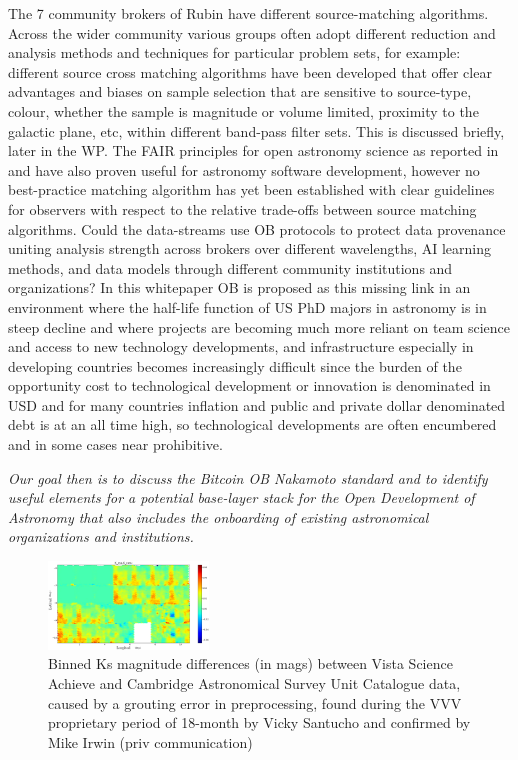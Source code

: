 \documentclass[final,5p,times,twocolumn,authoryear]{elsarticle}
\begin{document}
The 7 community brokers of Rubin have different source-matching \citep{bellm19} algorithms. Across the wider community various groups often adopt different reduction and analysis methods and techniques for particular problem sets, for example: different source cross matching algorithms have been developed that offer clear advantages and biases on sample selection that are sensitive to source-type, colour, whether the sample is magnitude or volume limited, proximity to the galactic plane, etc,  within different band-pass filter sets. This is discussed briefly, later in the WP. The FAIR principles for open astronomy science as reported in \cite{2022arXiv220310710O} and \cite{molinaro21} have also proven useful for astronomy software development, however no best-practice matching algorithm has yet been established with clear guidelines for observers with respect to the relative trade-offs between source matching algorithms.
 Could the data-streams use OB protocols to protect data provenance uniting analysis strength across brokers over different wavelengths, AI learning methods, and data models through different community institutions and organizations? In this whitepaper OB is proposed as this missing link in an environment where the half-life function of US PhD majors in astronomy is in steep decline and where projects are becoming much more reliant on team science and access to new technology developments, and infrastructure especially in developing countries becomes increasingly difficult since the burden of the opportunity cost to technological development or innovation is denominated in USD and for many countries inflation and public and private dollar denominated debt is at an all time high, so technological developments are often encumbered and in some cases near prohibitive.

\emph{Our goal then is to discuss the Bitcoin OB Nakamoto standard and to identify useful elements for a potential base-layer stack for the Open Development of Astronomy that also includes the onboarding of existing astronomical organizations and institutions.}

\begin{figure}
    \centering
    \includegraphics[width=0.38\textwidth]{figs/mapa_dif_Kvsa_Kcasu_grid80_1}
    \vspace*{-0.2cm}
    \caption{Binned Ks magnitude differences (in mags) between Vista Science Achieve and Cambridge Astronomical Survey Unit Catalogue data, caused by a grouting error in preprocessing, found during the VVV proprietary period of 18-month by Vicky Santucho and confirmed by Mike Irwin (priv communication)}
    \label{fig:mapa_dif_Kvsa_Kcasu_grid80_1}
\end{figure}
\end{document}
